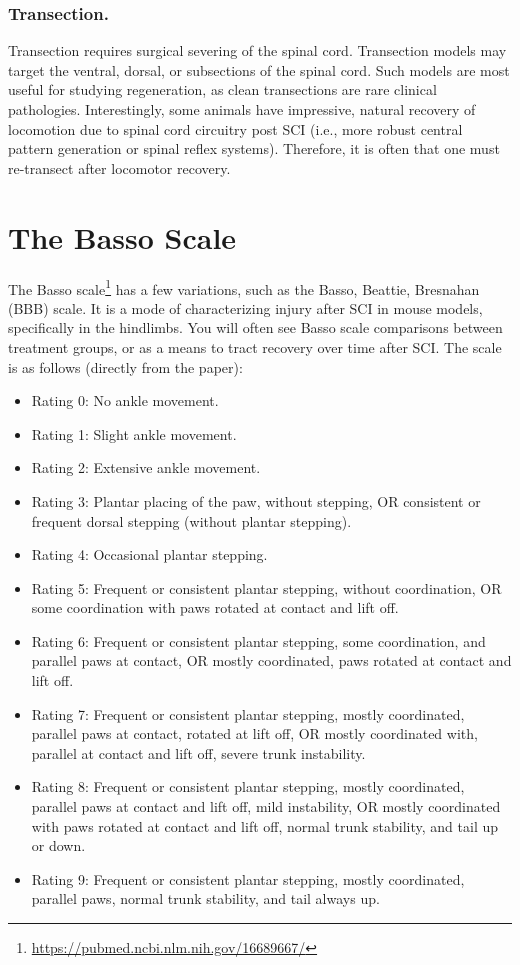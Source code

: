 \subsubsection{Transection.}
Transection requires surgical severing of the spinal cord. Transection models may target the ventral, dorsal, or subsections of the spinal cord. Such models are most useful for studying regeneration, as clean transections are rare clinical pathologies. Interestingly, some animals have impressive, natural recovery of locomotion due to spinal cord circuitry post SCI (i.e., more robust central pattern generation or spinal reflex systems). Therefore, it is often that one must re-transect after locomotor recovery. 

\section{The Basso Scale}

The Basso scale\footnote{\url{https://pubmed.ncbi.nlm.nih.gov/16689667/}} has a few variations, such as the Basso, Beattie, Bresnahan (BBB) scale. It is a mode of characterizing injury after SCI in mouse models, specifically in the hindlimbs. You will often see Basso scale comparisons between treatment groups, or as a means to tract recovery over time after SCI. The scale is as follows (directly from the paper): 

\begin{itemize}
    \itemsep 0em
    \item Rating 0: No ankle movement.
    \item Rating 1: Slight ankle movement. 
    \item Rating 2: Extensive ankle movement. 
    \item Rating 3: Plantar placing of the paw, without stepping, OR consistent or frequent dorsal stepping (without plantar stepping). 
    \item Rating 4: Occasional plantar stepping. 
    \item Rating 5: Frequent or consistent plantar stepping, without coordination, OR some coordination with paws rotated at contact and lift off. 
    \item Rating 6: Frequent or consistent plantar stepping, some coordination, and parallel paws at contact, OR mostly coordinated, paws rotated at contact and lift off. 
    \item Rating 7: Frequent or consistent plantar stepping, mostly coordinated, parallel paws at contact, rotated at lift off, OR mostly coordinated with, parallel at contact and lift off, severe trunk instability. 
    \item Rating 8: Frequent or consistent plantar stepping, mostly coordinated, parallel paws at contact and lift off, mild instability, OR mostly coordinated with paws rotated at contact and lift off, normal trunk stability, and tail up or down. 
    \item Rating 9: Frequent or consistent plantar stepping, mostly coordinated, parallel paws, normal trunk stability, and tail always up. 
\end{itemize}

